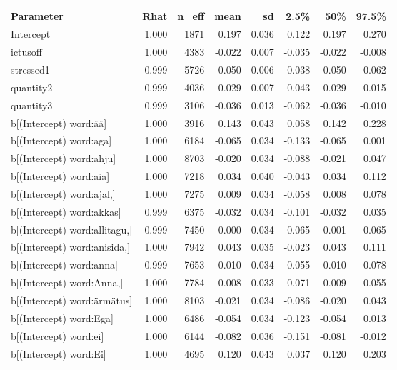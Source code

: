 \begin{longtable}{lrrrrrrr}
  \toprule
Parameter & Rhat & n\_eff & mean & sd & 2.5\% & 50\% & 97.5\% \\ 
  \midrule
Intercept & 1.000 & 1871 & 0.197 & 0.036 & 0.122 & 0.197 & 0.270 \\ 
  ictusoff & 1.000 & 4383 & -0.022 & 0.007 & -0.035 & -0.022 & -0.008 \\ 
  stressed1 & 0.999 & 5726 & 0.050 & 0.006 & 0.038 & 0.050 & 0.062 \\ 
  quantity2 & 0.999 & 4036 & -0.029 & 0.007 & -0.043 & -0.029 & -0.015 \\ 
  quantity3 & 0.999 & 3106 & -0.036 & 0.013 & -0.062 & -0.036 & -0.010 \\ 
  b[(Intercept) word:ää] & 1.000 & 3916 & 0.143 & 0.043 & 0.058 & 0.142 & 0.228 \\ 
  b[(Intercept) word:aga] & 1.000 & 6184 & -0.065 & 0.034 & -0.133 & -0.065 & 0.001 \\ 
  b[(Intercept) word:ahju] & 1.000 & 8703 & -0.020 & 0.034 & -0.088 & -0.021 & 0.047 \\ 
  b[(Intercept) word:aia] & 1.000 & 7218 & 0.034 & 0.040 & -0.043 & 0.034 & 0.112 \\ 
  b[(Intercept) word:ajal,] & 1.000 & 7275 & 0.009 & 0.034 & -0.058 & 0.008 & 0.078 \\ 
  b[(Intercept) word:akkas] & 0.999 & 6375 & -0.032 & 0.034 & -0.101 & -0.032 & 0.035 \\ 
  b[(Intercept) word:allitagu,] & 0.999 & 7450 & 0.000 & 0.034 & -0.065 & 0.001 & 0.065 \\ 
  b[(Intercept) word:anisida,] & 1.000 & 7942 & 0.043 & 0.035 & -0.023 & 0.043 & 0.111 \\ 
  b[(Intercept) word:anna] & 0.999 & 7653 & 0.010 & 0.034 & -0.055 & 0.010 & 0.078 \\ 
  b[(Intercept) word:Anna,] & 1.000 & 7784 & -0.008 & 0.033 & -0.071 & -0.009 & 0.055 \\ 
  b[(Intercept) word:ärmätus] & 1.000 & 8103 & -0.021 & 0.034 & -0.086 & -0.020 & 0.043 \\ 
  b[(Intercept) word:Ega] & 1.000 & 6486 & -0.054 & 0.034 & -0.123 & -0.054 & 0.013 \\ 
  b[(Intercept) word:ei] & 1.000 & 6144 & -0.082 & 0.036 & -0.151 & -0.081 & -0.012 \\ 
  b[(Intercept) word:Ei] & 1.000 & 4695 & 0.120 & 0.043 & 0.037 & 0.120 & 0.203 \\ 

\end{longtable}

